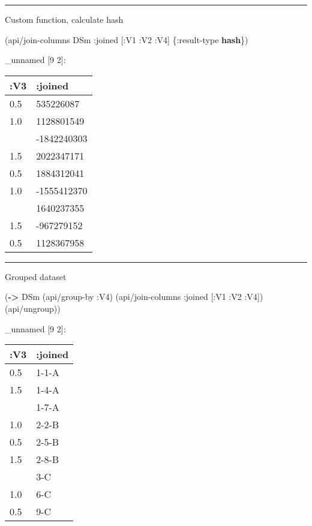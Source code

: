 \documentclass[]{article}
\newenvironment{Shaded}{\begin{snugshade}}{\end{snugshade}}
\newcommand{\AttributeTok}[1]{\textcolor[rgb]{0.77,0.63,0.00}{#1}}
\newcommand{\KeywordTok}[1]{\textcolor[rgb]{0.13,0.29,0.53}{\textbf{#1}}}
\newcommand{\NormalTok}[1]{#1}
\begin{document}
\begin{center}\rule{0.5\linewidth}{0.5pt}\end{center}

Custom function, calculate hash

\begin{Shaded}
\begin{Highlighting}[]
\NormalTok{(api/join-columns DSm }\AttributeTok{:joined}\NormalTok{ [}\AttributeTok{:V1} \AttributeTok{:V2} \AttributeTok{:V4}\NormalTok{] \{}\AttributeTok{:result-type} \KeywordTok{hash}\NormalTok{\})}
\end{Highlighting}
\end{Shaded}

\_unnamed {[}9 2{]}:

\begin{longtable}[]{@{}ll@{}}
\toprule
:V3 & :joined\tabularnewline
\midrule
\endhead
0.5 & 535226087\tabularnewline
1.0 & 1128801549\tabularnewline
& -1842240303\tabularnewline
1.5 & 2022347171\tabularnewline
0.5 & 1884312041\tabularnewline
1.0 & -1555412370\tabularnewline
& 1640237355\tabularnewline
1.5 & -967279152\tabularnewline
0.5 & 1128367958\tabularnewline
\bottomrule
\end{longtable}

\begin{center}\rule{0.5\linewidth}{0.5pt}\end{center}

Grouped dataset

\begin{Shaded}
\begin{Highlighting}[]
\NormalTok{(}\KeywordTok{->}\NormalTok{ DSm}
\NormalTok{    (api/group-by }\AttributeTok{:V4}\NormalTok{)}
\NormalTok{    (api/join-columns }\AttributeTok{:joined}\NormalTok{ [}\AttributeTok{:V1} \AttributeTok{:V2} \AttributeTok{:V4}\NormalTok{])}
\NormalTok{    (api/ungroup))}
\end{Highlighting}
\end{Shaded}

\_unnamed {[}9 2{]}:

\begin{longtable}[]{@{}ll@{}}
\toprule
:V3 & :joined\tabularnewline
\midrule
\endhead
0.5 & 1-1-A\tabularnewline
1.5 & 1-4-A\tabularnewline
& 1-7-A\tabularnewline
1.0 & 2-2-B\tabularnewline
0.5 & 2-5-B\tabularnewline
1.5 & 2-8-B\tabularnewline
& 3-C\tabularnewline
1.0 & 6-C\tabularnewline
0.5 & 9-C\tabularnewline
\bottomrule
\end{longtable}
\end{document}
